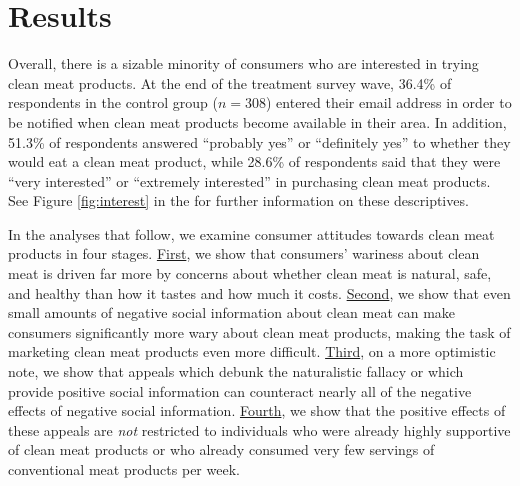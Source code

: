 \documentclass[12pt]{article}
\newcommand{\todo}[1]{\textit{\textcolor{red}{$<$todo$>$ #1 $<$/todo$>$}}}
\begin{document}
\section{Results}
\label{sec:results}



Overall, there is a sizable minority of consumers who are interested in trying clean meat products. At the end of the treatment survey wave, 36.4\% of respondents in the control group ($n=308$) entered their email address in order to be notified when clean meat products become available in their area. In addition, 51.3\% of respondents answered ``probably yes'' or ``definitely yes'' to whether they would eat a clean meat product, while 28.6\% of respondents said that they were ``very interested'' or ``extremely interested'' in purchasing clean meat products. See Figure \ref{fig:interest} in the  for further information on these descriptives.

In the analyses that follow, we examine consumer attitudes towards clean meat products in four stages. \underline{First}, we show that consumers' wariness about clean meat is driven far more by concerns about whether clean meat is natural, safe, and healthy than how it tastes and how much it costs. \underline{Second}, we show that even small amounts of negative social information about clean meat can make consumers significantly more wary about clean meat products, making the task of marketing clean meat products even more difficult. \underline{Third}, on a more optimistic note, we show that appeals which debunk the naturalistic fallacy or which provide positive social information can counteract nearly all of the negative effects of negative social information. \underline{Fourth}, we show that the positive effects of these appeals are \textit{not} restricted to individuals who were already highly supportive of clean meat products or who already consumed very few servings of conventional meat products per week.
\end{document}
